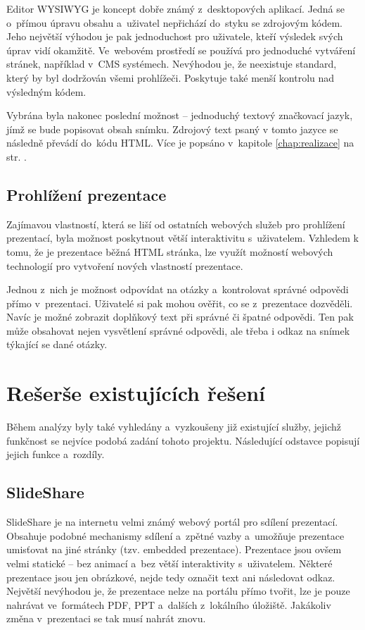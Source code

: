 \documentclass[11pt,twoside,a4paper]{book}
\begin{document}
Editor WYSIWYG je koncept dobře známý z~desktopových aplikací. Jedná se o~přímou úpravu obsahu a~uživatel nepřichází do~styku se zdrojovým kódem. Jeho největší výhodou je pak jednoduchost pro uživatele, kteří výsledek svých úprav vidí okamžitě. Ve~webovém prostředí se používá pro jednoduché vytváření stránek, například v~CMS systémech. Nevýhodou je, že neexistuje standard, který by byl dodržován všemi prohlížeči. Poskytuje také menší kontrolu nad výsledným kódem. 

Vybrána byla nakonec poslední možnost – jednoduchý textový značkovací jazyk, jímž se bude popisovat obsah snímku. Zdrojový text psaný v tomto jazyce se následně převádí do~kódu HTML. Více je popsáno v~kapitole \ref{chap:realizace}  na str. \pageref{chap:realizace}.

\subsection{Prohlížení prezentace}
Zajímavou vlastností, která se liší od ostatních webových služeb pro prohlížení prezentací, byla možnost poskytnout větší interaktivitu s~uživatelem. Vzhledem k tomu, že je prezentace běžná HTML stránka, lze využít možností webových technologií pro vytvoření nových vlastností prezentace.

Jednou z~nich je možnost odpovídat na otázky a~kontrolovat správné odpovědi přímo v~prezentaci. Uživatelé si pak mohou ověřit, co se z~prezentace dozvěděli. Navíc je možné zobrazit doplňkový text při správné či špatné odpovědi. Ten pak může obsahovat nejen vysvětlení správné odpovědi, ale třeba i odkaz na snímek týkající se dané otázky.


\section{Rešerše existujících řešení} \label{chap:existujiciSystemy}
Během analýzy byly také vyhledány a~vyzkoušeny již existující služby, jejichž funkčnost se nejvíce podobá zadání tohoto projektu. Následující odstavce popisují jejich funkce a~rozdíly.


\subsection{SlideShare}
SlideShare \cite{slideshare} je na internetu velmi známý webový portál pro sdílení prezentací. Obsahuje podobné mechanismy sdílení a~zpětné vazby a~umožňuje prezentace umisťovat na jiné stránky (tzv. embedded prezentace). Prezentace jsou ovšem velmi statické – bez animací a~bez větší interaktivity s~uživatelem. Některé prezentace jsou jen obrázkové, nejde tedy označit text ani následovat odkaz. Největší nevýhodou je, že prezentace nelze na portálu přímo tvořit, lze je pouze nahrávat ve~formátech PDF, PPT a~dalších z~lokálního úložiště. Jakákoliv změna v~prezentaci se tak musí nahrát znovu.
\end{document}
